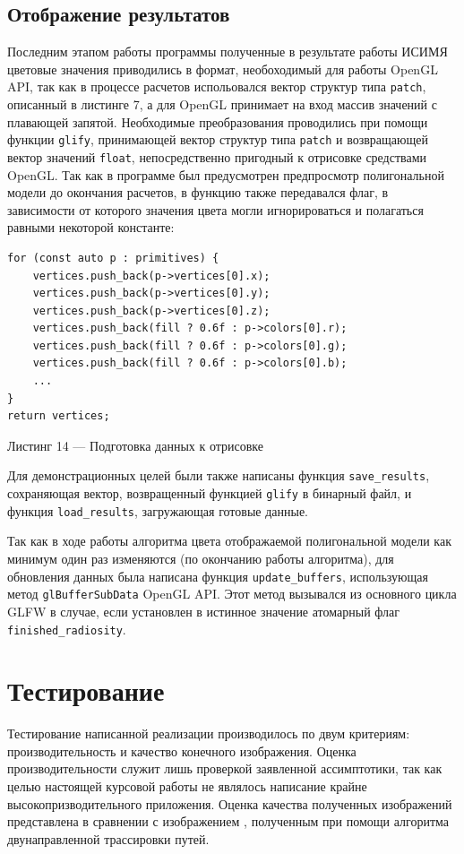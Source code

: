 \documentclass[12pt]{article}
\begin{document}
\subsection{Отображение результатов}
Последним этапом работы программы полученные в результате работы ИСИМЯ цветовые значения приводились в формат, необоходимый для работы OpenGL API, так как в процессе расчетов испольовался вектор структур типа \texttt{patch}, описанный в листинге 7, а для OpenGL принимает на вход массив значений с плавающей запятой. Необходимые преобразования проводились при помощи функции \texttt{glify}, принимающей вектор структур типа \texttt{patch} и возвращающей вектор значений \texttt{float}, непосредственно пригодный к отрисовке средствами OpenGL. Так как в программе был предусмотрен предпросмотр полигональной модели до окончания расчетов, в функцию также передавался флаг, в зависимости от которого значения цвета могли игнорироваться и полагаться равными некоторой константе:
\begin{lstlisting}
for (const auto p : primitives) {
    vertices.push_back(p->vertices[0].x);
    vertices.push_back(p->vertices[0].y);
    vertices.push_back(p->vertices[0].z);
    vertices.push_back(fill ? 0.6f : p->colors[0].r);
    vertices.push_back(fill ? 0.6f : p->colors[0].g);
    vertices.push_back(fill ? 0.6f : p->colors[0].b);
    ...
}
return vertices;
\end{lstlisting}
\begin{center}Листинг 14 --- Подготовка данных к отрисовке \end{center}

Для демонстрационных целей были также написаны функция \texttt{save\_results}, сохраняющая вектор, возвращенный функцией \texttt{glify} в бинарный файл, и функция \texttt{load\_results}, загружающая готовые данные.

Так как в ходе работы алгоритма цвета отображаемой полигональной модели как минимум один раз изменяются (по окончанию работы алгоритма), для обновления данных была написана функция \texttt{update\_buffers}, использующая метод \texttt{glBufferSubData} OpenGL API. Этот метод вызывался из основного цикла GLFW в случае, если установлен в истинное значение атомарный флаг \texttt{finished\_radiosity}.
\newpage\section{Тестирование}
Тестирование написанной реализации производилось по двум критериям: производительность и качество конечного изображения. Оценка производительности служит лишь проверкой заявленной ассимптотики, так как целью настоящей курсовой работы не являлось написание крайне высокопризводительного приложения. Оценка качества полученных изображений представлена в сравнении с изображением \cite{karlIMG}, полученным при помощи алгоритма двунаправленной трассировки путей.
\end{document}
